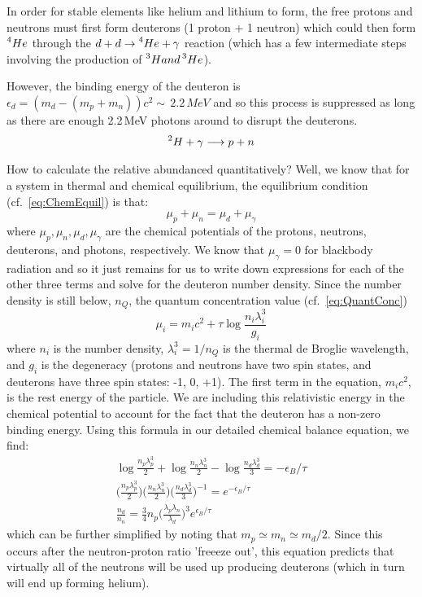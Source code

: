 In order for stable elements like helium and lithium to form, the free protons and neutrons 
must first form deuterons (1 proton + 1 neutron) which could then form $\prescript{4}{}He$ 
through the $d + d \rightarrow \prescript{4}{}He + \gamma$ reaction (which has a few 
intermediate steps involving the production of $\prescript{3}{}H and \prescript{3}{}He$). 

However, the binding energy of the deuteron is $\epsilon_{d} = (m_d - (m_p + m_n))c^2 \sim\,2.2\,MeV$
and so this process is suppressed as long as there are enough 2.2\,MeV photons around to 
disrupt the deuterons.
\begin{align}
\prescript{2}{}H + \gamma \longrightarrow p + n
\end{align}

How to calculate the relative abundanced quantitatively? Well, we know that for a system in thermal and chemical equilibrium, the equilibrium condition (cf.~\cref{eq:ChemEquil}) is that:
\begin{equation}
\mu_p + \mu_n = \mu_d + \mu_{\gamma}
\end{equation}
where $\mu_p, \mu_n, \mu_d, \mu_{\gamma}$ are the chemical potentials of the protons, neutrons, deuterons, and photons, respectively. We know that $\mu_{\gamma} = 0$ for blackbody radiation and so it just remains for us to write down expressions for each of the other three terms and solve for the deuteron number density. Since the number density is still below, $n_Q$, the quantum concentration value (cf.~\cref{eq:QuantConc})
\begin{equation}
\mu_i = m_i c^2 + \tau \log{\frac{n_i \lambda_i^3}{g_i}}
\end{equation}
where $n_i$ is the number density, $\lambda_i^3 = 1/n_Q$ is the thermal de Broglie wavelength, and $g_i$ is the degeneracy (protons and neutrons have two spin states, and deuterons have three spin states: -1, 0, +1). The first term in the equation, $m_i c^2$, is the rest energy of the particle. We are including this relativistic energy in the chemical potential to account for the fact that the deuteron has a non-zero binding energy. Using this formula in our detailed chemical balance equation, we find:
\begin{align}
\log{\frac{n_p \lambda_p^3}{2}} + \log{\frac{n_n \lambda_n^3}{2}} - \log{\frac{n_d \lambda_d^3}{3}} = -\epsilon_B/\tau \\
\bigg(\frac{n_p \lambda_p^3}{2}\bigg)\bigg(\frac{n_n \lambda_n^3}{2}\bigg)\bigg(\frac{n_d \lambda_d^3}{3}\bigg)^{-1} = e^{-\epsilon_B/\tau} \\
\frac{n_d}{n_n} = \frac{3}{4} n_p \bigg(\frac{\lambda_p \lambda_n}{\lambda_d}\bigg)^3 e^{\epsilon_B/\tau}
\end{align}
which can be further simplified by noting that $m_p \simeq m_n \simeq m_d/2$. Since this occurs after the neutron-proton ratio 'freeeze out', this equation predicts that virtually all of the neutrons will be used up producing deuterons (which
in turn will end up forming helium).\\

